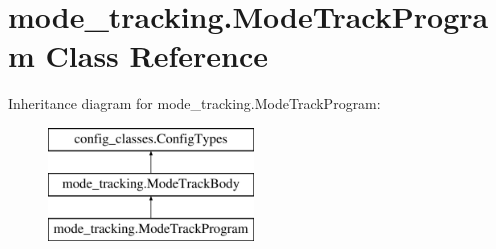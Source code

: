 \hypertarget{classmode__tracking_1_1_mode_track_program}{\section{mode\-\_\-tracking.\-Mode\-Track\-Program Class Reference}
\label{classmode__tracking_1_1_mode_track_program}
}
Inheritance diagram for mode\-\_\-tracking.\-Mode\-Track\-Program\-:\begin{figure}[H]
\begin{center}
\leavevmode
\includegraphics[height=3.000000cm]{classmode__tracking_1_1_mode_track_program}
\end{center}
\end{figure}
